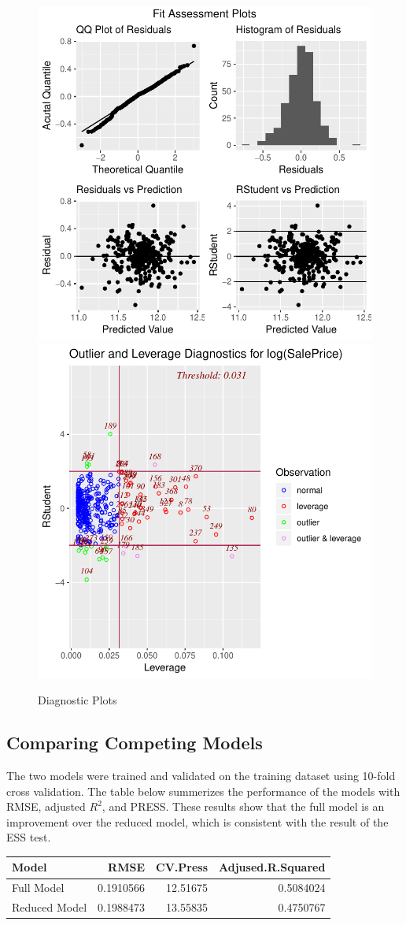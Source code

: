 \documentclass[american,]{article}
\begin{document}
\begin{figure}[htbp]

{\centering \includegraphics[width=0.45\linewidth]{HousePriceRegressionAnalysis_files/figure-latex/diag-plots-1} \includegraphics[width=0.45\linewidth]{HousePriceRegressionAnalysis_files/figure-latex/diag-plots-2} 

}

\caption{Diagnostic Plots}\label{fig:diag-plots}
\end{figure}

\hypertarget{comparing-competing-models}{%
\subsection{Comparing Competing
Models}\label{comparing-competing-models}}

The two models were trained and validated on the training dataset using
10-fold cross validation. The table below summerizes the performance of
the models with RMSE, adjusted \(R^2\), and PRESS. These results show
that the full model is an improvement over the reduced model, which is
consistent with the result of the ESS test.

\begin{table}[H]
\centering
\begin{tabular}{lrrr}
\toprule
Model & RMSE & CV.Press & Adjused.R.Squared\\
\midrule
Full Model & 0.1910566 & 12.51675 & 0.5084024\\
Reduced Model & 0.1988473 & 13.55835 & 0.4750767\\
\bottomrule
\end{tabular}
\end{table}
\end{document}
